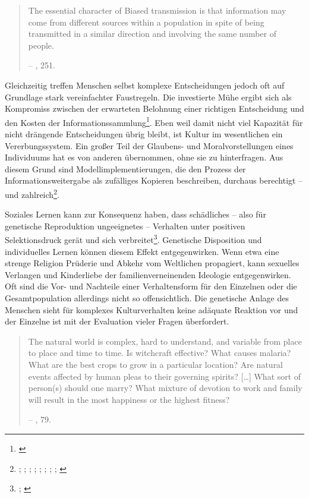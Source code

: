 \documentclass[openany,twoside,twocolumn]{book}
\let\rmarkdownfootnote\footnote%
\def\footnote{\protect\rmarkdownfootnote}
\begin{document}
\begin{quote}
The essential character of Biased transmission is that information may
come from different sources within a population in spite of being
transmitted in a similar direction and involving the same number of
people.

-- \textcite{eerkens_cultural_2007}, 251.
\end{quote}

Gleichzeitig treffen Menschen selbst komplexe Entscheidungen jedoch oft
auf Grundlage stark vereinfachter Faustregeln. Die investierte Mühe
ergibt sich als Kompromiss zwischen der erwarteten Belohnung einer
richtigen Entscheidung und den Kosten der Informationssammlung\footnote{\textcite{nisbett_human_1980}}.
Eben weil damit nicht viel Kapazität für nicht drängende Entscheidungen
übrig bleibt, ist Kultur im wesentlichen ein Vererbungssystem. Ein
großer Teil der Glaubens- und Moralvorstellungen eines Individuums hat
es von anderen übernommen, ohne sie zu hinterfragen. Aus diesem Grund
sind Modellimplementierungen, die den Prozess der Informationsweitergabe
als zufälliges Kopieren beschreiben, durchaus berechtigt -- und
zahlreich\footnote{\textcite{bentley_academic_2006};
  \textcite{bentley_cultural_2003}; \textcite{bentley_random_2004-1};
  \textcite{hahn_drift_2003}; \textcite{herzog_random_2004};
  \textcite{lipo_science_2001}; \textcite{lipo_population_1997};
  \textcite{neiman_stylistic_1995}; \textcite{shennan_ceramic_2001}}.

Soziales Lernen kann zur Konsequenz haben, dass schädliches -- also für
genetische Reproduktion ungeeignetes -- Verhalten unter positiven
Selektionsdruck gerät und sich verbreitet\footnote{\textcite{eerkens_cultural_2007};
  \textcite{enquist_evolution_2007}}. Genetische Disposition und
individuelles Lernen können diesem Effekt entgegenwirken. Wenn etwa eine
strenge Religion Prüderie und Abkehr vom Weltlichen propagiert, kann
sexuelles Verlangen und Kinderliebe der familienverneinenden Ideologie
entgegenwirken. Oft sind die Vor- und Nachteile einer Verhaltensform für
den Einzelnen oder die Gesamtpopulation allerdings nicht so
offensichtlich. Die genetische Anlage des Menschen sieht für komplexes
Kulturverhalten keine adäquate Reaktion vor und der Einzelne ist mit der
Evaluation vieler Fragen überfordert.

\begin{quote}
The natural world is complex, hard to understand, and variable from
place to place and time to time. Is witchcraft effective? What causes
malaria? What are the best crops to grow in a particular location? Are
natural events affected by human pleas to their governing spirits?
{[}\ldots{}{]} What sort of person(s) should one marry? What mixture of
devotion to work and family will result in the most happiness or the
highest fitness?

-- \textcite{smith_cultural_1992}, 79.
\end{quote}
\end{document}
